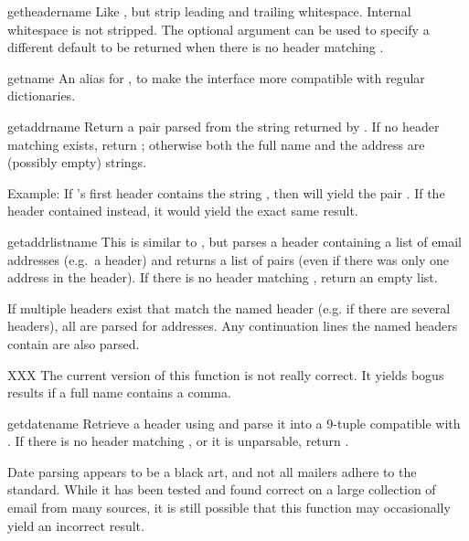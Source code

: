 \begin{methoddesc}{getheader}{name}
Like , but strip leading and trailing
whitespace.  Internal whitespace is not stripped.  The optional
 argument can be used to specify a different default to
be returned when there is no header matching .
\end{methoddesc}

\begin{methoddesc}{get}{name}
An alias for , to make the interface more compatible 
with regular dictionaries.
\end{methoddesc}

\begin{methoddesc}{getaddr}{name}
Return a pair  parsed
from the string returned by .  If no
header matching  exists, return ;
otherwise both the full name and the address are (possibly empty)
strings.

Example: If 's first  header contains the string
, then
 will yield the pair
.
If the header contained
 instead, it would yield the
exact same result.
\end{methoddesc}

\begin{methoddesc}{getaddrlist}{name}
This is similar to , but parses a header
containing a list of email addresses (e.g.\ a  header) and
returns a list of  pairs
(even if there was only one address in the header).  If there is no
header matching , return an empty list.

If multiple headers exist that match the named header (e.g. if there
are several  headers), all are parsed for addresses.  Any
continuation lines the named headers contain are also parsed.

XXX The current version of this function is not really correct.  It
yields bogus results if a full name contains a comma.
\end{methoddesc}

\begin{methoddesc}{getdate}{name}
Retrieve a header using  and parse it into a 9-tuple
compatible with .  If there is no header matching
, or it is unparsable, return .

Date parsing appears to be a black art, and not all mailers adhere to
the standard.  While it has been tested and found correct on a large
collection of email from many sources, it is still possible that this
function may occasionally yield an incorrect result.
\end{methoddesc}

